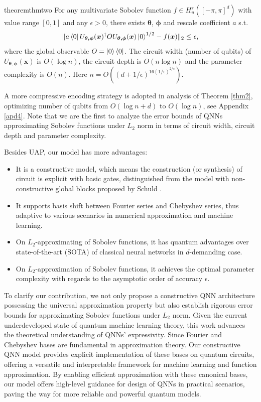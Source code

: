 \documentclass{article}
\theoremstyle{plain}
\theoremstyle{definition}
\theoremstyle{remark}
\begin{document}
\begin{restatable}{theorem}{thmtwo}\label{thm2}
    For any multivariate Sobolev function $f\in H_u^s([-\pi,\pi]^d)$ with value range $[0,1]$ and any $\epsilon >0$, there exists $\boldsymbol{\theta}$, $\boldsymbol{\phi}$ and rescale coefficient $a$ s.t. 
    \begin{equation*}
        \Vert a\bra{0}U_{\boldsymbol{\theta,\phi}}(\boldsymbol{x})^\dagger O U_{\boldsymbol{\theta,\phi}}(\boldsymbol{x})\ket{0}^{1/2} 
        -
        f(\boldsymbol{x})
        \Vert_{2}
        \leq
        \epsilon,
    \end{equation*}
    where the global observable $O=\ket{0}\bra{0}$. 
    The circuit width (number of qubits) of $U_{\boldsymbol{\theta,\phi}}(\boldsymbol{x})$ is 
    $O(\log n)$, 
    the circuit depth is
    $O(n\log n)$ 
    and the parameter complexity is 
    $O(n)$. Here $n=O((d+1/\epsilon)^{16(1/\epsilon)^{2/s}})$.
\end{restatable}

A more compressive encoding strategy is adopted in analysis of Theorem \ref{thm2}, optimizing number of qubits from $O(\log n+d)$ to $O(\log n)$, see Appendix \ref{apd4}. Note that we are the first to analyze the error bounds of QNNs approximating Sobolev functions under $L_2$ norm in terms of circuit width, circuit depth and parameter complexity.

Besides UAP, our model has more advantages:
\begin{itemize}
    \item It is a constructive model, which means the construction (or synthesis) of circuit is explicit with basic gates, distinguished from the model with non-constructive global blocks proposed by Schuld .
    \item It supports basis shift between Fourier series and Chebyshev series, thus adaptive to various scenarios in numerical approximation and machine learning. 
    \item On $L_2$-approximating of Sobolev functions, it has quantum advantages over state-of-the-art (SOTA) of classical neural networks in $d$-demanding case. 
    \item On $L_2$-approximation of Sobolev functions, it achieves the optimal parameter complexity with regards to the asymptotic order of accuracy $\epsilon$.
\end{itemize}

 To clarify our contribution, we not only propose a constructive QNN architecture possessing the universal approximation property but also establish rigorous error bounds for approximating Sobolev functions under $L_2$ norm. Given the current underdeveloped state of quantum machine learning theory, this work advances the theoretical understanding of QNNs' expressivity. Since Fourier and Chebyshev bases are fundamental in approximation theory. Our constructive QNN model provides explicit implementation of these bases on quantum circuits, offering a versatile and interpretable framework for machine learning and function approximation. By enabling efficient approximation with these canonical bases, our model offers high-level guidance for design of QNNs in practical scenarios, paving the way for more reliable and powerful quantum models.
\end{document}
